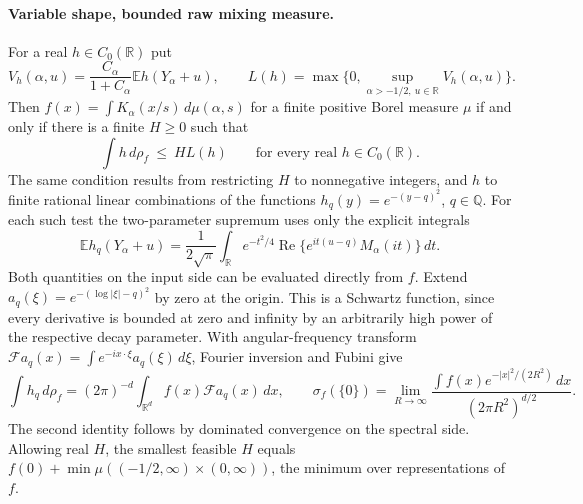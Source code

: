 \documentclass[11pt,a4paper]{article}
\numberwithin{equation}{section}
\begin{document}
\paragraph{Variable shape, bounded raw mixing measure.}
For a real $h\in C_0(\mathbb R)$ put
\[
 V_h(\alpha,u)=\frac{C_\alpha}{1+C_\alpha}
                   \mathbb E h(Y_\alpha+u),\qquad
 L(h)=\max\{0,\sup_{\alpha>-1/2,\ u\in\mathbb R}V_h(\alpha,u)\}.
\]
Then $f(x)=\int K_\alpha(x/s)\,d\mu(\alpha,s)$ for a finite
positive Borel measure $\mu$ if and only if there is a finite $H\ge0$
such that
\begin{equation}\label{eq:ball-all}
             \int h\,d\rho_f\ \le\ H L(h)
                   \qquad\text{for every real }h\in C_0(\mathbb R).
\end{equation}
The same condition results from restricting $H$ to nonnegative
integers, and $h$ to finite rational linear combinations of the functions
$h_q(y)=e^{-(y-q)^2}$, $q\in\mathbb Q$. For each such test the
two-parameter supremum uses only the explicit integrals
\begin{equation}\label{eq:ball-Gauss-test}
 \mathbb E h_q(Y_\alpha+u)
  =\frac1{2\sqrt\pi}
    \int_{\mathbb R} e^{-t^2/4}
         \operatorname{Re}\{e^{it(u-q)}M_\alpha(it)\}\,dt .
\end{equation}
Both quantities on the input side can be evaluated directly from $f$.
Extend $a_q(\xi)=e^{-(\log|\xi|-q)^2}$ by zero at the origin.
This is a Schwartz function, since every derivative is bounded at zero
and infinity by an arbitrarily high power of the respective decay
parameter. With angular-frequency transform
$\mathcal Fa_q(x)=\int e^{-ix\cdot\xi}a_q(\xi)\,d\xi$,
Fourier inversion and Fubini give
\[
 \int h_q\,d\rho_f=(2\pi)^{-d}\int_{\mathbb R^d}
             f(x)\mathcal Fa_q(x)\,dx,\qquad
 \sigma_f(\{0\})=\lim_{R\to\infty}
 \frac{\int f(x)e^{-|x|^2/(2R^2)}\,dx}{(2\pi R^2)^{d/2}}.
\]
The second identity follows by dominated convergence on the spectral
side. Allowing real $H$, the smallest feasible $H$ equals
$f(0)+\min\mu(({-}1/2,\infty)\times(0,\infty))$, the minimum over
representations of $f$.
\end{document}
